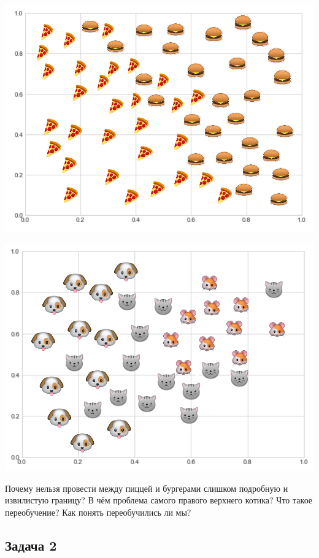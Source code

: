 \documentclass[12pt, a4paper, oneside]{article}
\begin{document}
\begin{minipage}[t]{0.45\textwidth}
	\includegraphics[scale=0.25]{class_1.png}
\end{minipage}
\hfill
\begin{minipage}[t]{0.45\textwidth}
	\includegraphics[scale=0.25]{class_2.png}
\end{minipage}

Почему нельзя провести между пиццей и бургерами слишком подробную и извилистую границу? В чём проблема самого правого верхнего котика? Что такое переобучение?  Как понять переобучились ли мы? 


\subsection*{Задача 2}
\end{document}
